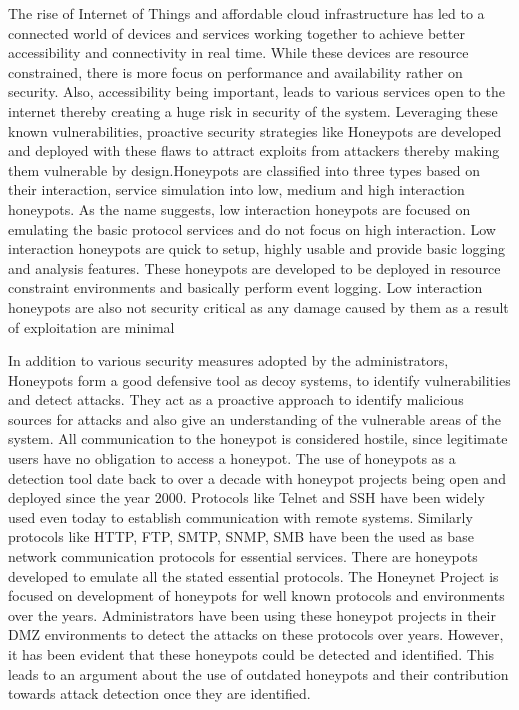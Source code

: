 \documentclass[letterpaper, 10 pt, conference]{ieeeconf}  %
\begin{document}
The rise of Internet of Things and affordable cloud infrastructure has led to a connected world of devices and services working together to achieve better accessibility and connectivity in real time. While these devices are resource constrained, there is more focus on performance and availability rather on security. Also, accessibility being important, leads to various services open to the internet thereby creating a huge risk in security of the system. Leveraging these known vulnerabilities, proactive security strategies like Honeypots are developed and deployed with these flaws to attract exploits from attackers thereby making them vulnerable by design.Honeypots are classified into three types based on their interaction, service simulation into low, medium and high interaction honeypots. As the name suggests, low interaction honeypots are focused on emulating the basic protocol services and do not focus on high interaction. Low interaction honeypots are quick to setup, highly usable and provide basic logging and analysis features. These honeypots are developed  to be deployed in resource constraint environments and basically perform event logging. Low interaction honeypots are also not security critical as any damage caused by them as a result of exploitation are minimal 

In addition to various security measures adopted by the administrators, Honeypots form a good defensive tool as decoy systems, to identify vulnerabilities and detect attacks. They act as a proactive approach to identify malicious sources for attacks and also give an understanding of the vulnerable areas of the system. All communication to the honeypot is considered hostile, since legitimate users have no obligation to access a honeypot. The use of honeypots as a detection tool date back to over a decade with honeypot projects being open and deployed since the year 2000. Protocols like Telnet and SSH have been widely used even today to establish communication with remote systems. Similarly protocols like HTTP, FTP, SMTP, SNMP, SMB have been the used as base network communication protocols for essential services. There are honeypots developed to emulate all the stated essential protocols. The Honeynet Project \cite{Honeynet} is focused on development of honeypots for well known protocols and environments over the years. Administrators have been using these honeypot projects in their DMZ environments to detect the attacks on these protocols over years. However, it has been evident that these honeypots could be detected and identified. This leads to an argument about the use of outdated honeypots and their contribution towards attack detection once they are identified.
\end{document}
